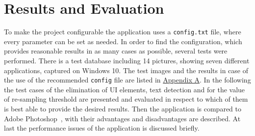 \documentclass[draft,final]{vutinfth} %
\begin{document}
	\chapter{Results and Evaluation}
	To make the project configurable the application uses a \texttt{config.txt} file, where every parameter can be set as needed.
	In order to find the configuration, which provides reasonable results in as many cases as possible, several tests were performed.
	There is a test database including 14 pictures, showing seven different applications, captured on Windows 10.
	The test images and the results in case of the use of the recommended \texttt{config} file are listed in \hyperref[AppA]{Appendix A}. 
	In the following the test cases of the elimination of UI elements, text detection and for the value of re-sampling threshold are presented and evaluated in respect to which of them is best able to provide the desired results.
	Then the application is compared to Adobe Photoshop~\cite{photoshop}, with their advantages and disadvantages are described.
	At last the performance issues of the application is discussed briefly.
\end{document}
